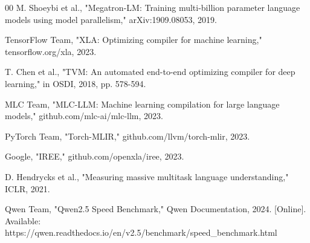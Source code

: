 \documentclass[conference]{IEEEtran}
\begin{document}
\begin{thebibliography}{00}
 M. Shoeybi et al., "Megatron-LM: Training multi-billion parameter language models using model parallelism," arXiv:1909.08053, 2019.

 TensorFlow Team, "XLA: Optimizing compiler for machine learning," tensorflow.org/xla, 2023.

 T. Chen et al., "TVM: An automated end-to-end optimizing compiler for deep learning," in OSDI, 2018, pp. 578-594.

 MLC Team, "MLC-LLM: Machine learning compilation for large language models," github.com/mlc-ai/mlc-llm, 2023.

 PyTorch Team, "Torch-MLIR," github.com/llvm/torch-mlir, 2023.

 Google, "IREE," github.com/openxla/iree, 2023.

 D. Hendrycks et al., "Measuring massive multitask language understanding," ICLR, 2021.

 Qwen Team, "Qwen2.5 Speed Benchmark," Qwen Documentation, 2024. [Online]. Available: https://qwen.readthedocs.io/en/v2.5/benchmark/speed\_benchmark.html

\end{thebibliography}
\end{document}
